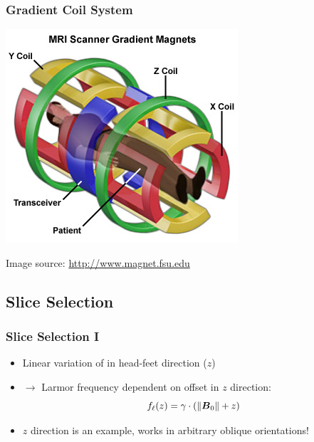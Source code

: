 \begin{frame}
	\frametitle{Gradient Coil System}
	
	\begin{center}
		\includegraphics[height=0.8\textheight]{images/mri_scannercoils}
	\end{center}
	
	{\scriptsize Image source: \url{http://www.magnet.fsu.edu}}
\end{frame}




\subsection{Slice Selection} %
\label{sub:slice_selection}

\begin{frame}
	\frametitle{Slice Selection I}
	
	\begin{itemize}
		\item Linear variation of  in head-feet direction ($z$)
		\item $\rightarrow$ Larmor frequency \larmorfreq{} dependent on offset in $z$ direction:
		$$f_\ell(z) = \gamma \cdot \left( \Vert \boldsymbol{B}_{0} \Vert + z \right)$$
	\end{itemize}
	
	\begin{center}
		\begingroup
		
		\endgroup
	\end{center}
	
	\begin{itemize}
		\item $z$ direction is an example, works in arbitrary oblique orientations!
	\end{itemize}
\end{frame}

